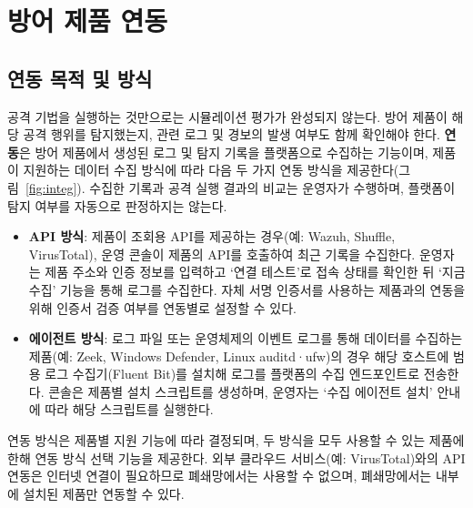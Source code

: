 \clearpage

\section{방어 제품 연동}\label{sec:integrations}

\subsection{연동 목적 및 방식}\label{subsec:integ-modes}

공격 기법을 실행하는 것만으로는 시뮬레이션 평가가 완성되지 않는다. 방어 제품이 해당 공격 행위를 탐지했는지, 관련 로그 및 경보의 발생 여부도 함께 확인해야 한다.
\textbf{연동}은 방어 제품에서 생성된 로그 및 탐지 기록을 플랫폼으로 수집하는 기능이며, 제품이 지원하는 데이터 수집 방식에 따라 다음 두 가지 연동 방식을 제공한다(그림~\ref{fig:integ}).
수집한 기록과 공격 실행 결과의 비교는 운영자가 수행하며, 플랫폼이 탐지 여부를 자동으로 판정하지는 않는다.

\begin{itemize}
    \item \textbf{API 방식}: 제품이 조회용 API를 제공하는 경우(예: Wazuh, Shuffle, VirusTotal), 운영 콘솔이 제품의 API를 호출하여 최근 기록을 수집한다. 운영자는 제품 주소와 인증 정보를 입력하고 `연결 테스트'로 접속 상태를 확인한 뒤 `지금 수집' 기능을 통해 로그를 수집한다. 자체 서명 인증서를 사용하는 제품과의 연동을 위해 인증서 검증 여부를 연동별로 설정할 수 있다.
    \item \textbf{에이전트 방식}: 로그 파일 또는 운영체제의 이벤트 로그를 통해 데이터를 수집하는 제품(예: Zeek, Windows Defender, Linux auditd·ufw)의 경우 해당 호스트에 범용 로그 수집기(Fluent Bit)를 설치해 로그를 플랫폼의 수집 엔드포인트로 전송한다. 콘솔은 제품별 설치 스크립트를 생성하며, 운영자는 `수집 에이전트 설치' 안내에 따라 해당 스크립트를 실행한다.
\end{itemize}

연동 방식은 제품별 지원 기능에 따라 결정되며, 두 방식을 모두 사용할 수 있는 제품에 한해 연동 방식 선택 기능을 제공한다.
외부 클라우드 서비스(예: VirusTotal)와의 API 연동은 인터넷 연결이 필요하므로 폐쇄망에서는 사용할 수 없으며, 폐쇄망에서는 내부에 설치된 제품만 연동할 수 있다.

